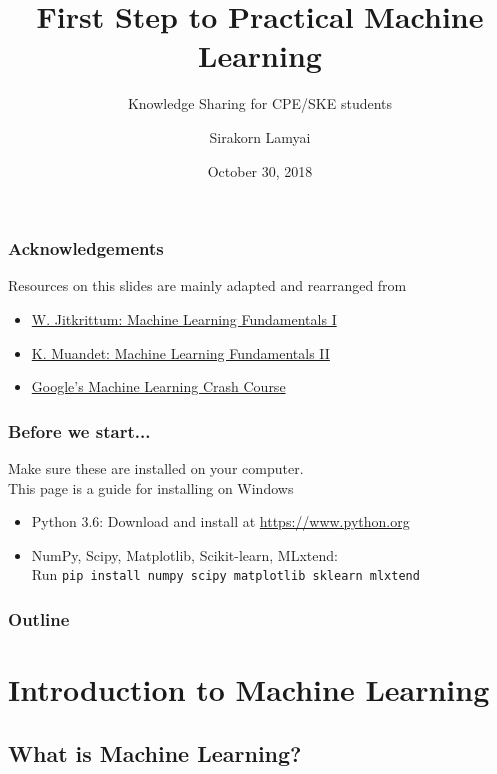 \documentclass[aspectratio=169]{beamer}
\title{First Step to Practical Machine Learning}
\subtitle{Knowledge Sharing for CPE/SKE students}
\author{Sirakorn Lamyai}
\institute{Student, Kasetsart U.}
\date{October 30, 2018}
\begin{document}
\begin{frame}
	\titlepage
\end{frame}

\begin{frame}
	\frametitle{Acknowledgements}
	Resources on this slides are mainly adapted and rearranged from
	\begin{itemize}
		\item \href{https://docs.google.com/presentation/d/1oGIyzoMHT3-TTS23NPL-qzh0EAXb6kyK0S_1n5MjmgQ/edit\#slide=id.p}{W. Jitkrittum: Machine Learning Fundamentals I}
		\item \href{http://krikamol.org/tutorial/slides/vistec-talk-16-March-2018.pdf}{K. Muandet: Machine Learning Fundamentals II}
		\item \href{}{Google's Machine Learning Crash Course}
	\end{itemize}
\end{frame}

\begin{frame}
	\frametitle{Before we start...}
	Make sure these are installed on your computer.\\
	{\tiny This page is a guide for installing on Windows}

	\begin{itemize}
		\item Python 3.6: Download and install at \url{https://www.python.org}
		\item NumPy, Scipy, Matplotlib, Scikit-learn, MLxtend:\\
		      Run \texttt{pip install numpy scipy matplotlib sklearn mlxtend}
	\end{itemize}
\end{frame}

\begin{frame}
	\frametitle{Outline}
	\tableofcontents
\end{frame}

\section{Introduction to Machine Learning}

\subsection{What is Machine Learning?}
\end{document}
